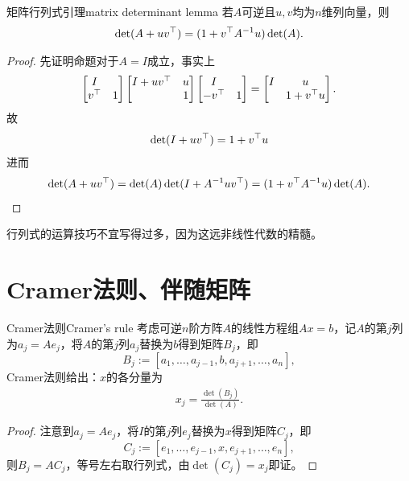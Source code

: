 \begin{theorem}
	{矩阵行列式引理}{matrix determinant lemma}
	若$A$可逆且$u,v$均为$n$维列向量，则
	\begin{align}
		\det(A + uv^\top) = (1 + v^\top A^{-1} u)\det(A).
	\end{align}
\end{theorem}
\begin{proof}
	先证明命题对于$A = I$成立，事实上
	\begin{align*}
		\begin{bmatrix}
			I\\v^\top&1
		\end{bmatrix}
		\begin{bmatrix}
			I + uv^\top&u\\ &1
		\end{bmatrix}
		\begin{bmatrix}
			I\\-v^\top&1
		\end{bmatrix} =
		\begin{bmatrix}
			I&u\\ &1 + v^\top u
		\end{bmatrix}.
	\end{align*}
	故
	\begin{align}
		\det(I + uv^\top) = 1 + v^\top u
	\end{align}
	进而 
	\[
		\det(A + uv^\top) = \det(A)\det(I + A^{-1} uv^\top) = (1 + v^\top A^{-1} u)\det(A).
		\qedhere
	\]
\end{proof}
\begin{remark}
	行列式的运算技巧不宜写得过多，因为这远非线性代数的精髓。
\end{remark}
\section{Cramer法则、伴随矩阵}
\begin{theorem}{Cramer法则}{Cramer's rule}
	考虑可逆$n$阶方阵$A$的线性方程组$Ax = b$，记$A$的第$j$列为$a_j = Ae_j$，将$A$的第$j$列$a_j$替换为$b$得到矩阵$B_j$，即
	\[
		B_j := [a_1,\ldots,a_{j-1},b,a_{j+1},\ldots,a_n],
	\]
	Cramer法则给出：$x$的各分量为
	\begin{align}
		x_j = \frac{\det(B_j)}{\det(A)}.
	\end{align}
\end{theorem}

\begin{proof}
	注意到$a_j = Ae_j$，将$I$的第$j$列$e_j$替换为$x$得到矩阵$C_j$，即
	\[
		C_j := [e_1,\ldots,e_{j-1},x,e_{j+1},\ldots,e_n],
	\]
	则$B_j = AC_j$，等号左右取行列式，由$\det(C_j) = x_j$即证。
\end{proof}

